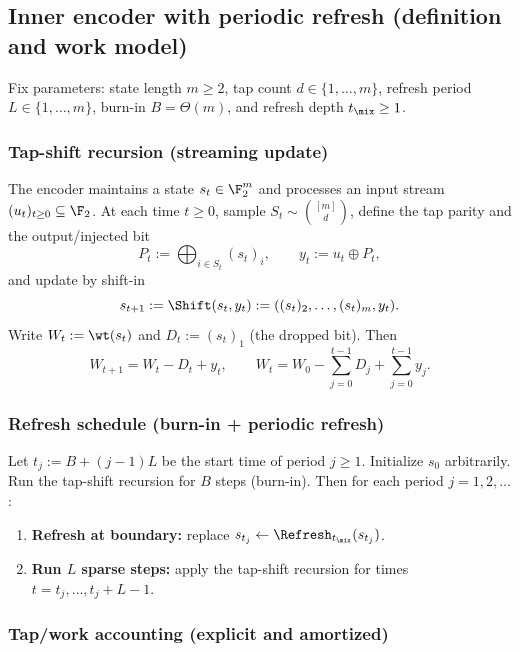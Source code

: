 \subsection{Inner encoder with periodic refresh (definition and work model)}
\label{sec:inner-definition}

Fix parameters:
state length \(m\ge 2\), tap count \(d\in\{1,\dots,m\}\), refresh period \(L\in\{1,\dots,m\}\),
burn-in \(B=\Theta(m)\), and refresh depth \(t_{\mix}\ge 1\).

\subsubsection*{Tap-shift recursion (streaming update)}

The encoder maintains a state \(s_t\in\F_2^m\) and processes an input stream \((u_t)_{t\ge 0}\subseteq \F_2\).
At each time \(t\ge 0\), sample \(S_t\sim\binom{[m]}{d}\), define the tap parity and the output/injected bit
\[
P_t := \bigoplus_{i\in S_t} (s_t)_i,
\qquad
y_t := u_t \oplus P_t,
\]
and update by shift-in
\[
s_{t+1} := \Shift(s_t,y_t) := ((s_t)_2,\dots,(s_t)_m,y_t).
\]
Write \(W_t:=\wt(s_t)\) and \(D_t:=(s_t)_1\) (the dropped bit). Then
\[
W_{t+1} = W_t - D_t + y_t,
\qquad
W_t = W_0 - \sum_{j=0}^{t-1}D_j + \sum_{j=0}^{t-1}y_j.
\]

\subsubsection*{Refresh schedule (burn-in + periodic refresh)}

Let \(t_j := B + (j-1)L\) be the start time of period \(j\ge 1\).
Initialize \(s_0\) arbitrarily. Run the tap-shift recursion for \(B\) steps (burn-in).
Then for each period \(j=1,2,\dots\):
\begin{enumerate}
\item \textbf{Refresh at boundary:} replace \(s_{t_j}\leftarrow \Refresh_{t_{\mix}}(s_{t_j})\).
\item \textbf{Run \(L\) sparse steps:} apply the tap-shift recursion for times \(t=t_j,\dots,t_j+L-1\).
\end{enumerate}

\subsubsection*{Tap/work accounting (explicit and amortized)}

